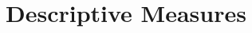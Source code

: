 \documentclass{article}\usepackage[]{graphicx}\usepackage[]{color}
\begin{document}
\subsection{}

\subsection{}

\subsection{}

\subsection{}

\subsection{}

\subsection{}

\subsection{}

\subsection{}

\subsection{}

\subsection{}

\subsection{}

\section{Descriptive Measures}
\end{document}

